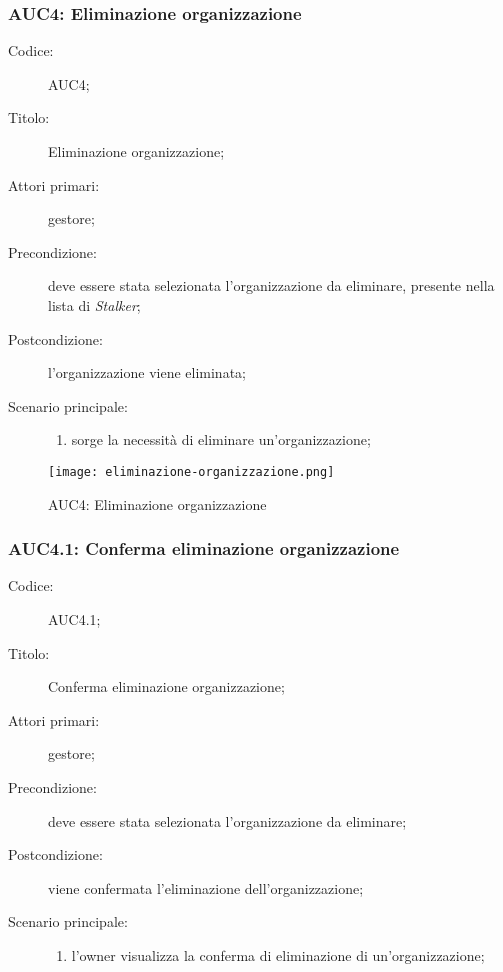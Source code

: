 \documentclass[../../../analisi-dei-requisiti.tex]{subfiles}
\begin{document}
\subsubsection{AUC4: Eliminazione organizzazione}%
\label{subs:AUC4}
\begin{description}
  \item[Codice:] AUC4;
  \item[Titolo:] Eliminazione organizzazione;
  \item[Attori primari:] gestore;
  \item[Precondizione:] deve essere stata selezionata l'organizzazione da eliminare, presente nella lista di \emph{Stalker};
  \item[Postcondizione:] l'organizzazione viene eliminata;
  \item[Scenario principale:]
        \begin{enumerate}
          \item sorge la necessità di eliminare un'organizzazione;
        \end{enumerate}
\end{description}

\begin{figure}[H]
  \centering
  \texttt{[image: eliminazione-organizzazione.png]}
  \caption{AUC4: Eliminazione organizzazione}%
  \label{fig:AUC4}
\end{figure}

\subsubsection{AUC4.1: Conferma eliminazione organizzazione}%
\label{subs:AUC4.1}
\begin{description}
  \item[Codice:] AUC4.1;
  \item[Titolo:] Conferma eliminazione organizzazione;
  \item[Attori primari:] gestore;
  \item[Precondizione:] deve essere stata selezionata l'organizzazione da eliminare;
  \item[Postcondizione:] viene confermata l'eliminazione dell'organizzazione;
  \item[Scenario principale:]
        \begin{enumerate}
          \item l'owner visualizza la conferma di eliminazione di un'organizzazione;
        \end{enumerate}
\end{description}
\end{document}
